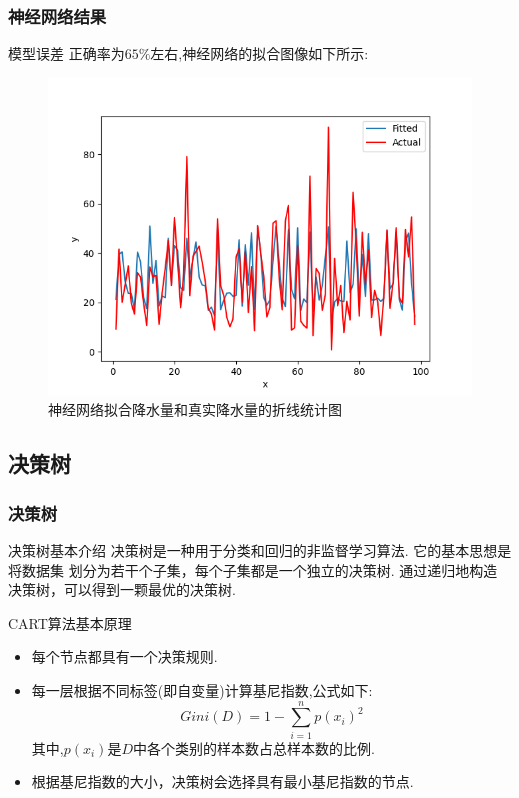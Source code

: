 \documentclass[10pt]{beamer}
\begin{document}
\begin{frame}
	\frametitle{神经网络结果}
	\begin{block}{模型误差}
		正确率为$65\%$左右,神经网络的拟合图像如下所示:
		\begin{figure}[h!]
			\centering
			\includegraphics[scale=0.4]{../latex/success.png}
			\caption{神经网络拟合降水量和真实降水量的折线统计图}
		\end{figure}
	\end{block}
\end{frame}

\subsection{决策树}

\begin{frame}
	\frametitle{决策树}
	\begin{block}{决策树基本介绍}
		决策树是一种用于分类和回归的非监督学习算法. 它的基本思想是将数据集
		划分为若干个子集，每个子集都是一个独立的决策树. 通过递归地构造
		决策树，可以得到一颗最优的决策树.
	\end{block}

	\begin{block}{CART算法基本原理}
		\begin{itemize}
			\item 每个节点都具有一个决策规则.
			\item 每一层根据不同标签(即自变量)计算基尼指数,公式如下:
			      \begin{equation}
				      Gini(D) = 1-\sum_{i=1}^{n}{{p(x_i)}^2}
			      \end{equation}
			      其中,$p(x_i)$是$D$中各个类别的样本数占总样本数的比例.
			\item 根据基尼指数的大小，决策树会选择具有最小基尼指数的节点.
		\end{itemize}
	\end{block}
\end{frame}
\end{document}
